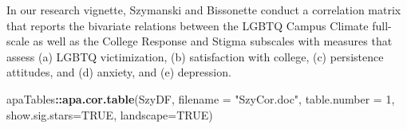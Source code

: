 \documentclass[
  english,
]{book}
\newenvironment{Shaded}{\begin{snugshade}}{\end{snugshade}}
\newcommand{\DataTypeTok}[1]{\textcolor[rgb]{0.13,0.29,0.53}{#1}}
\newcommand{\DecValTok}[1]{\textcolor[rgb]{0.00,0.00,0.81}{#1}}
\newcommand{\KeywordTok}[1]{\textcolor[rgb]{0.13,0.29,0.53}{\textbf{#1}}}
\newcommand{\NormalTok}[1]{#1}
\newcommand{\OperatorTok}[1]{\textcolor[rgb]{0.81,0.36,0.00}{\textbf{#1}}}
\newcommand{\OtherTok}[1]{\textcolor[rgb]{0.56,0.35,0.01}{#1}}
\newcommand{\StringTok}[1]{\textcolor[rgb]{0.31,0.60,0.02}{#1}}
\begin{document}
In our research vignette, Szymanski and Bissonette \citeyearpar{szymanski_perceptions_2020} conduct a correlation matrix that reports the bivariate relations between the LGBTQ Campus Climate full-scale as well as the College Response and Stigma subscales with measures that assess (a) LGBTQ victimization, (b) satisfaction with college, (c) persistence attitudes, and (d) anxiety, and (e) depression.

\begin{Shaded}
\begin{Highlighting}[]
\NormalTok{apaTables}\OperatorTok{::}\KeywordTok{apa.cor.table}\NormalTok{(SzyDF, }\DataTypeTok{filename =} \StringTok{"SzyCor.doc"}\NormalTok{, }\DataTypeTok{table.number =} \DecValTok{1}\NormalTok{, }\DataTypeTok{show.sig.stars=}\OtherTok{TRUE}\NormalTok{, }\DataTypeTok{landscape=}\OtherTok{TRUE}\NormalTok{)}
\end{Highlighting}
\end{Shaded}
\end{document}
